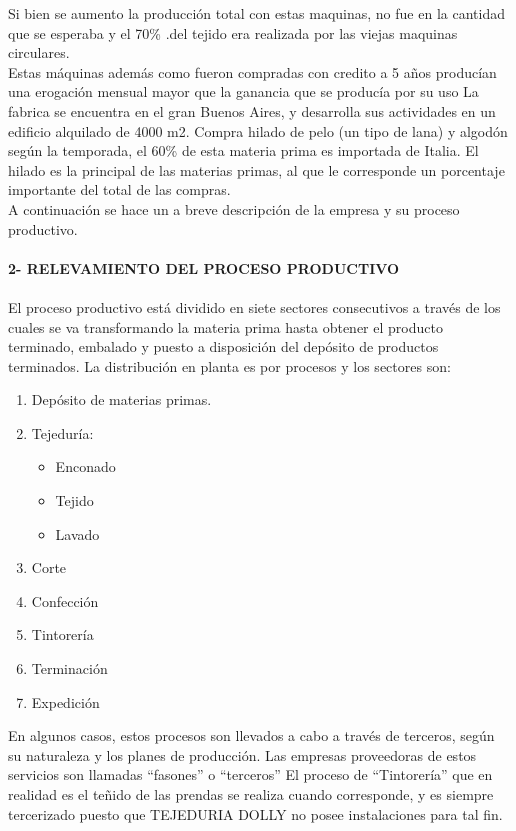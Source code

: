 \documentclass[a4paper,10pt,titlepage]{article}
\begin{document}
Si bien se aumento la producci\'on total con estas maquinas, no fue en la cantidad
que se esperaba y el 70\% .del tejido era realizada por las viejas maquinas
circulares.\\
Estas m\'aquinas adem\'as como fueron compradas con credito a 5 años produc\'ian
una erogaci\'on mensual mayor que la ganancia que se produc\'ia por su uso
La fabrica se encuentra en el gran Buenos Aires, y desarrolla sus actividades en un
edificio alquilado de 4000 m2. Compra hilado de pelo (un tipo de lana) y algod\'on
seg\'un la temporada, el 60\% de esta materia prima es importada de Italia. El hilado
es la principal de las materias primas, al que le corresponde un porcentaje
importante del total de las compras.\\ 
A continuaci\'on se hace un a breve descripci\'on de la empresa y su proceso
productivo.\\ \\

\textbf{2- RELEVAMIENTO DEL PROCESO PRODUCTIVO}\\ \\
El proceso productivo est\'a dividido en siete sectores consecutivos a trav\'es de los
cuales se va transformando la materia prima hasta obtener el producto terminado,
embalado y puesto a disposici\'on del dep\'osito de productos terminados. La
distribuci\'on en planta es por procesos y los sectores son:\\

\begin{enumerate}
 \item Dep\'osito de materias primas.
 \item Tejedur\'ia: 
\begin{itemize}
 \item Enconado
 \item Tejido
 \item Lavado
\end{itemize}
 \item Corte
 \item Confecci\'on
 \item Tintorer\'ia
 \item Terminaci\'on
 \item Expedici\'on
\end{enumerate}

En algunos casos, estos procesos son llevados a cabo a trav\'es de terceros, seg\'un
su naturaleza y los planes de producci\'on. Las empresas proveedoras de estos
servicios son llamadas ``fasones'' o ``terceros''
El proceso de ``Tintorer\'ia'' que en realidad es el teñido de las prendas se realiza
cuando corresponde, y es siempre tercerizado puesto que TEJEDURIA DOLLY no
posee instalaciones para tal fin.\\
\end{document}
